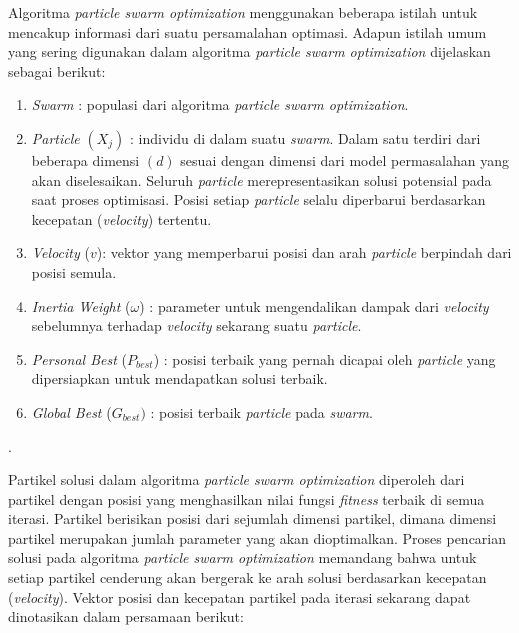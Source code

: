 {{    Algoritma \textit{particle swarm optimization} menggunakan beberapa istilah untuk mencakup informasi dari suatu persamalahan optimasi.
    Adapun istilah umum yang sering digunakan dalam algoritma \textit{particle swarm optimization} dijelaskan sebagai berikut:
    \begin{enumerate}[align=left, left=0em, nolistsep]
        \item \textit{Swarm} : populasi dari algoritma \textit{particle swarm optimization}.
        \item \textit{Particle} $(X_{j})$ : individu di dalam suatu \textit{swarm}.
              Dalam satu terdiri dari beberapa dimensi $(d)$ sesuai dengan dimensi dari model permasalahan yang akan diselesaikan.
              Seluruh \textit{particle} merepresentasikan solusi potensial pada saat proses optimisasi.
              Posisi setiap \textit{particle} selalu diperbarui berdasarkan kecepatan (\textit{velocity}) tertentu.
        \item \textit{Velocity} (\textbf{$v$}): vektor yang memperbarui posisi dan arah \textit{particle} berpindah dari posisi semula.
        \item \textit{Inertia Weight} ($\omega$) : parameter untuk mengendalikan dampak dari \textit{velocity} sebelumnya terhadap \textit{velocity} sekarang suatu \textit{particle}.
        \item \textit{Personal Best} ($P_{best}$) : posisi terbaik yang pernah dicapai oleh \textit{particle} yang dipersiapkan untuk mendapatkan solusi terbaik.
        \item \textit{Global Best} ($G_{best})$ : posisi terbaik \textit{particle} pada \textit{swarm}.
    \end{enumerate}
    \begin{rightcite}
        .
    \end{rightcite}

    Partikel solusi dalam algoritma \textit{particle swarm optimization} diperoleh dari partikel dengan posisi yang menghasilkan nilai fungsi \textit{fitness} terbaik di semua iterasi.
    Partikel berisikan posisi dari sejumlah dimensi partikel, dimana dimensi partikel merupakan jumlah parameter yang akan dioptimalkan.
    Proses pencarian solusi pada algoritma \textit{particle swarm optimization} memandang bahwa untuk setiap partikel cenderung akan bergerak ke arah solusi berdasarkan kecepatan (\textit{velocity}).
    Vektor posisi dan kecepatan partikel pada iterasi sekarang dapat dinotasikan dalam persamaan berikut:

}}
